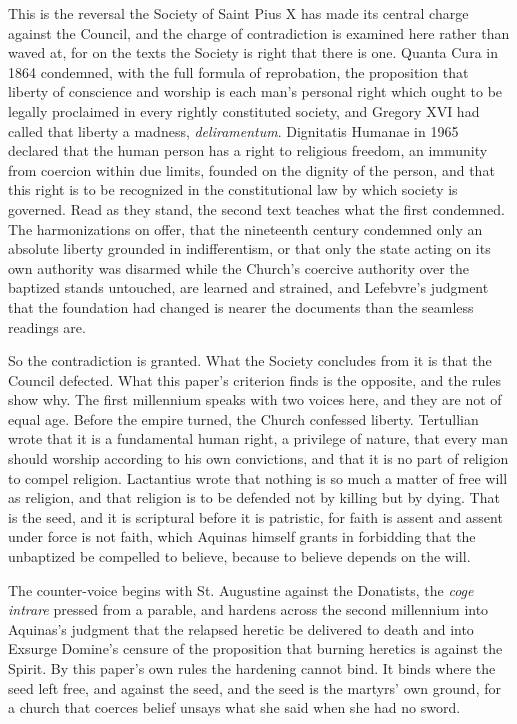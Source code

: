 \documentclass[11pt,twoside]{article}
\newcommand{\unit}[1]{\needspace{3\baselineskip}\par\medskip{\normalfont\bfseries\color{subhead}#1}\par\nobreak\smallskip}
\begin{document}
\unit{Religious liberty.}
This is the reversal the Society of Saint Pius X has made its central charge against the Council, and the charge of contradiction is examined here rather than waved at, for on the texts the Society is right that there is one. Quanta Cura in 1864 condemned, with the full formula of reprobation, the proposition that liberty of conscience and worship is each man's personal right which ought to be legally proclaimed in every rightly constituted society, and Gregory XVI had called that liberty a madness, \emph{deliramentum}. Dignitatis Humanae in 1965 declared that the human person has a right to religious freedom, an immunity from coercion within due limits, founded on the dignity of the person, and that this right is to be recognized in the constitutional law by which society is governed. Read as they stand, the second text teaches what the first condemned. The harmonizations on offer, that the nineteenth century condemned only an absolute liberty grounded in indifferentism, or that only the state acting on its own authority was disarmed while the Church's coercive authority over the baptized stands untouched, are learned and strained, and Lefebvre's judgment that the foundation had changed is nearer the documents than the seamless readings are.

So the contradiction is granted. What the Society concludes from it is that the Council defected. What this paper's criterion finds is the opposite, and the rules show why. The first millennium speaks with two voices here, and they are not of equal age. Before the empire turned, the Church confessed liberty. Tertullian wrote that it is a fundamental human right, a privilege of nature, that every man should worship according to his own convictions, and that it is no part of religion to compel religion. Lactantius wrote that nothing is so much a matter of free will as religion, and that religion is to be defended not by killing but by dying. That is the seed, and it is scriptural before it is patristic, for faith is assent and assent under force is not faith, which Aquinas himself grants in forbidding that the unbaptized be compelled to believe, because to believe depends on the will.

The counter-voice begins with St. Augustine against the Donatists, the \emph{coge intrare} pressed from a parable, and hardens across the second millennium into Aquinas's judgment that the relapsed heretic be delivered to death and into Exsurge Domine's censure of the proposition that burning heretics is against the Spirit. By this paper's own rules the hardening cannot bind. It binds where the seed left free, and against the seed, and the seed is the martyrs' own ground, for a church that coerces belief unsays what she said when she had no sword.
\end{document}
